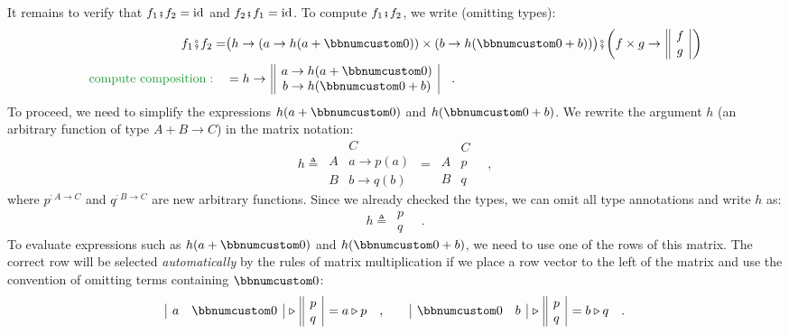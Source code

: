 It remains to verify that $f_{1}\bef f_{2}=\text{id}$ and $f_{2}\bef f_{1}=\text{id}$.
To compute $f_{1}\bef f_{2}$, we write (omitting types):
\begin{align*}
f_{1}\bef f_{2}= & \big(h\rightarrow(a\rightarrow h(a+\bbnum 0))\times(b\rightarrow h(\bbnum 0+b))\big)\bef\bigg(f\times g\rightarrow\,\begin{array}{||c|}
f\\
g
\end{array}\,\bigg)\\
{\color{greenunder}\text{compute composition}:}\quad & =h\rightarrow\,\begin{array}{||c|}
a\rightarrow h(a+\bbnum 0)\\
b\rightarrow h(\bbnum 0+b)
\end{array}\quad.
\end{align*}
To proceed, we need to simplify the expressions $h(a+\bbnum 0)$ and
$h(\bbnum 0+b)$. We rewrite the argument $h$ (an arbitrary function
of type $A+B\rightarrow C$) in the matrix notation:
\[
h\triangleq\,\begin{array}{|c||c|}
 & C\\
\hline A & a\rightarrow p(a)\\
B & b\rightarrow q(b)
\end{array}\,=\,\begin{array}{|c||c|}
 & C\\
\hline A & p\\
B & q
\end{array}\quad,
\]
where $p^{:A\rightarrow C}$ and $q^{:B\rightarrow C}$ are new arbitrary
functions. Since we already checked the types, we can omit all type
annotations and write $h$ as:
\[
h\triangleq\,\begin{array}{||c|}
p\\
q
\end{array}\quad.
\]
To evaluate expressions such as $h(a+\bbnum 0)$ and $h(\bbnum 0+b)$,
we need to use one of the rows of this matrix. The correct row will
be selected \emph{automatically} by the rules of matrix multiplication
if we place a row vector to the left of the matrix and use the convention
of omitting terms containing $\bbnum 0$:
\[
\begin{array}{|cc|}
a & \bbnum 0\end{array}\,\triangleright\,\begin{array}{||c|}
p\\
q
\end{array}\,=a\triangleright p\quad,\quad\quad\begin{array}{|cc|}
\bbnum 0 & b\end{array}\,\triangleright\,\begin{array}{||c|}
p\\
q
\end{array}\,=b\triangleright q\quad.
\]
